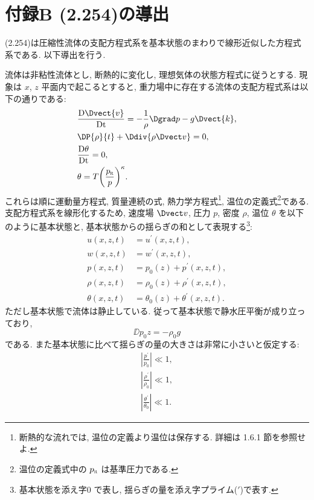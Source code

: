 \documentclass[a4j,12pt,openbib,oneside,dvipdfmx]{jsbook}
\def\theequation{\arabic{chapter}.\arabic{equation}}
\begin{document}
\section*{付録B (2.254)の導出}
\def\theequation{B.\arabic{equation}}
\setcounter{equation}{0}
(2.254)は圧縮性流体の支配方程式系を基本状態のまわりで線形近似した方程式系である. 以下導出を行う. 
\par
流体は非粘性流体とし, 断熱的に変化し, 理想気体の状態方程式に従うとする. 現象は $x$, $z$ 平面内で起こるとすると, 重力場中に存在する流体の支配方程式系は以下の通りである: 
\begin{align}
 & \frac{\mathrm{D}{\Dvect{v}}}{\mathrm{Dt}}=-{{\frac{1}{\rho}}\Dgrad p}-g\Dvect{k},\label{ma}\\
 & \DP{\rho}{t} +\Ddiv{{\rho}\Dvect v}=0,\label{th}\\
 & \frac{\mathrm{D\theta}}{\mathrm{Dt}}=0\label{da},\\
 & \theta=T{\left(\frac{p_{\scalebox{0.5}{R}}}{p} \right)}^\kappa.\label{me}
\end{align}
これらは順に運動量方程式, 質量連続の式, 熱力学方程式\footnote{断熱的な流れでは, 温位の定義より温位は保存する. 詳細は 1.6.1 節を参照せよ.}, 温位の定義式\footnote{温位の定義式中の $p_{\scalebox{0.5}{R}}$ は基準圧力である.}である. 
支配方程式系を線形化するため, 速度場 $\Dvect v$, 圧力 $p$, 密度 $\rho$, 温位 $\theta$ を以下のように基本状態と, 基本状態からの揺らぎの和として表現する\footnote{基本状態を添え字$0$ で表し, 揺らぎの量を添え字プライム($'$)で表す.}:
\begin{subequations}
\begin{align}
  u(x,z,t)&=u^{\prime}(x,z,t),\label{u}\\
  w(x,z,t)&=w^{\prime}(x,z,t),\label{w}\\
  p(x,z,t)&=p_0(z)+{p^{\prime}}{(x,z,t)},\label{p}\\
  \rho(x,z,t)&=\rho_0(z)+{{\rho}^{\prime}}{(x,z,t)},\label{rho}\\
  \theta(x,z,t)&=\theta_0(z)+{{\theta}^{\prime}}{(x,z,t)}.\label{the}
\end{align}
\end{subequations}
ただし基本状態で流体は静止している. 従って基本状態で静水圧平衡が成り立っており,
\begin{equation}
  \DD{p_0}{z}=-{\rho_0}g \label{rhog}
\end{equation}
である. また基本状態に比べて揺らぎの量の大きさは非常に小さいと仮定する:
\begin{subequations}
\begin{align}
  {\left|\frac{p^\prime}{p_0}\right|}\ll 1,\\
  {\left|\frac{\rho^\prime}{\rho_0}\right|}\ll 1,\\
  {\left|\frac{\theta^\prime}{\theta_0}\right|}\ll 1.
  \end{align}
\end{subequations}
\end{document}
